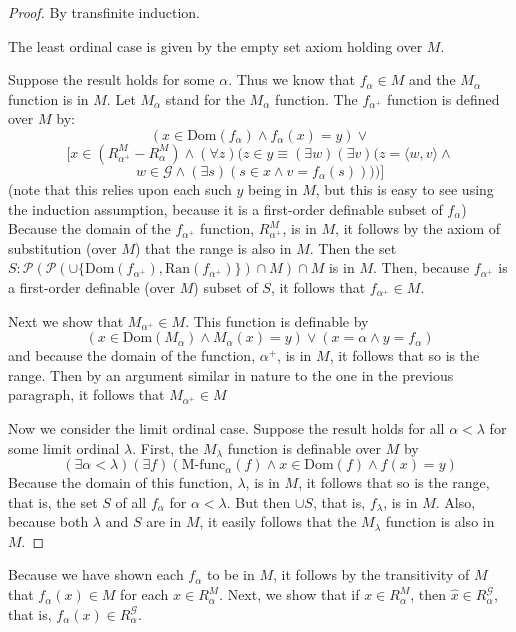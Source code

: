 \documentclass{article}
\theoremstyle{definition}
\begin{document}
\begin{proof}
By transfinite induction.

The least ordinal case is given by the empty set axiom holding over $M$.

Suppose the result holds for some $\alpha$. Thus we know that $f_\alpha\in M$ and 
the $M_\alpha$ function is in $M$. Let $M_\alpha$ stand for the $M_\alpha$ function. 
The $f_{\alpha^+}$ function is defined over $M$ by:
\[ (x\in\textrm{Dom}(f_\alpha)\wedge f_\alpha(x)=y)\vee \]
\[ [x\in(R^M_{\alpha^+}-R^M_\alpha)\wedge(\forall z)(z\in y\equiv(\exists w)(\exists v)(z=\langle w,v\rangle\wedge \]
\[ w\in\mathcal{G}\wedge(\exists s)(s\in x\wedge v=f_\alpha(s))))] \] 
(note that this relies upon each such $y$ being in $M$, but this is easy to see using the induction assumption, because 
it is a first-order definable subset of $f_\alpha$)
Because the domain of the $f_{\alpha^+}$ function, $R^M_{\alpha^+}$, is in $M$, it follows 
by the axiom of substitution (over $M$) that the range is also in $M$. Then the set 
$S:\mathcal{P}(\mathcal{P}(\cup\{\textrm{Dom}(f_{\alpha^+}),\textrm{Ran}(f_{\alpha^+})\})\cap M)\cap M$ is in $M$. Then, 
because $f_{\alpha^+}$ is a first-order definable (over $M$) subset of $S$, it follows that $f_{\alpha^+}\in M$.

Next we show that $M_{\alpha^+}\in M$. This function is definable by
\[ (x\in\textrm{Dom}(M_\alpha)\wedge M_\alpha(x)=y)\vee (x=\alpha\wedge y=f_\alpha) \]
and because the domain of the function, $\alpha^+$, is in $M$, it follows that so is the range. Then by an 
argument similar in nature to the one in the previous paragraph, it follows that $M_{\alpha^+}\in M$

Now we consider the limit ordinal case. Suppose the result holds for all $\alpha<\lambda$ for some limit ordinal 
$\lambda$. First, the $M_\lambda$ function is definable over $M$ by
\[ (\exists\alpha<\lambda)(\exists f)(\textrm{M-func}_\alpha(f)\wedge x\in\textrm{Dom}(f)\wedge f(x)=y) \]
Because the domain of this function, $\lambda$, is in $M$, it follows that so is the range, that is, 
the set $S$ of all $f_\alpha$ for $\alpha<\lambda$. But then $\cup S$, that is, $f_\lambda$, is in $M$. Also, because 
both $\lambda$ and $S$ are in $M$, it easily follows that the $M_\lambda$ function is also in $M$. 

\end{proof}

Because we have shown each $f_\alpha$ to be in $M$, it follows by the transitivity of $M$ that 
$f_\alpha(x)\in M$ for each $x\in R^M_\alpha$. 
Next, we show that if $x\in R^M_\alpha$, then $\hat{x}\in R^\mathcal{G}_\alpha$, that is, 
$f_\alpha(x)\in R^\mathcal{G}_\alpha$.
\end{document}

